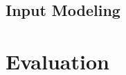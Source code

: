 \documentclass[10pt,conference,compsocconf]{IEEEtran}
\newcommand{\etal}[1]{\emph{#1 et al.}}
\begin{document}

\subsection{Input Modeling}



\section{Evaluation}
\end{document}
